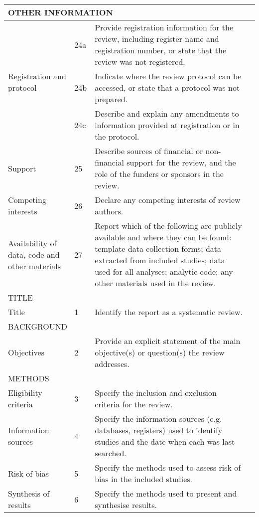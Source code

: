 \documentclass[landscape]{article}
\begin{document}
\begin{longtable}{|p{2.5cm}|p{0.5cm}|p{18cm}|p{3cm}|}
    \hline \hline
    \multicolumn{4}{l}{OTHER INFORMATION} \\
    \hline
    \multirow{3}{2.5cm}{Registration and protocol}& 24a  &  Provide registration information for the review, including register name and registration number, or state that the review was not registered.& \\
    \cline{2-4}
     &  24b&Indicate where the review protocol can be accessed, or state that a protocol was not prepared. & \\
     \cline{2-4}
     &  24c& Describe and explain any amendments to information provided at registration or in the protocol.& \\
     \hline
     Support& 25 &Describe sources of financial or non-financial support for the review, and the role of the funders or sponsors in the review. & \\ \hline
     Competing interests &  26& Declare any competing interests of review authors.& \\ \hline
      Availability of data, code and other materials & 27 & Report which of the following are publicly available and where they can be found: template data collection forms; data extracted from included studies; data used for all analyses; analytic code; any other materials used in the review.& \\
    \hline
    \multicolumn{4}{l}{TITLE} \\
    \hline
    Title & 1 & Identify the report as a systematic review. & \\
    \hline \hline
    \multicolumn{4}{l}{BACKGROUND} \\
    \hline
    Objectives & 2 &Provide an explicit statement of the main objective(s) or question(s) the review addresses. & \\
    \hline \hline
    \multicolumn{4}{l}{METHODS} \\
    \hline
    Eligibility criteria &3 &Specify the inclusion and exclusion criteria for the review. & \\
    \hline
    Information sources & 4&Specify the information sources (e.g. databases, registers) used to identify studies and the date when each was last searched. & \\
    \hline
    Risk of bias& 5& Specify the methods used to assess risk of bias in the included studies. & \\
    \hline
    Synthesis of results & 6& Specify the methods used to present and synthesise results.& \\
    \hline \hline

\end{longtable}
\end{document}
